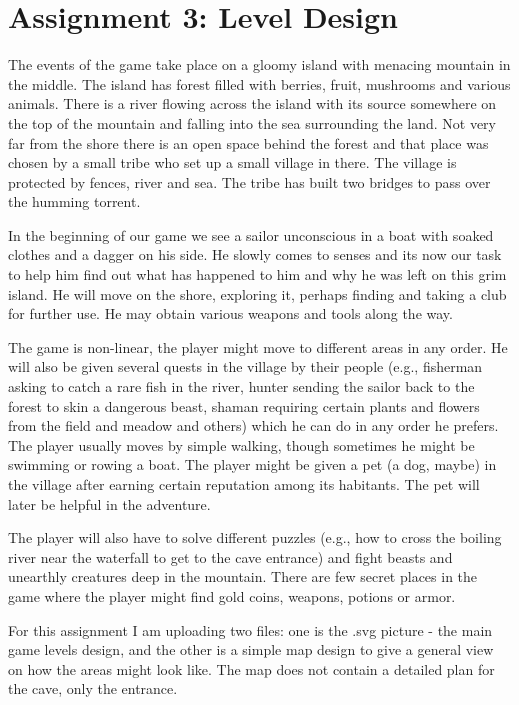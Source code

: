 \documentclass{article}
\begin{document}
\section*{Assignment 3: Level Design}

The events of the game take place on a gloomy island with menacing mountain in
the middle. The island has forest filled with berries, fruit, mushrooms and
various animals. There is a river flowing across the island with its source
somewhere on the top of the mountain and falling into the sea surrounding the
land. Not very far from the shore there is an open space behind the forest and
that place was chosen by a small tribe who set up a small village in there. The
village is protected by fences, river and sea. The tribe has built two bridges
to pass over the humming torrent.

In the beginning of our game we see a sailor unconscious in a boat with soaked
clothes and a dagger on his side. He slowly comes to senses and its now our task
to help him find out what has happened to him and why he was left on this grim
island. He will move on the shore, exploring it, perhaps finding and taking a
club for further use. He may obtain various weapons and tools along the way.

The game is non-linear, the player might move to different areas in any order.
He will also be given several quests in the village by their people (e.g.,
fisherman asking to catch a rare fish in the river, hunter sending the sailor
back to the forest to skin a dangerous beast, shaman requiring certain plants
and flowers from the field and meadow and others) which he can do in any order
he prefers. The player usually moves by simple walking, though sometimes he
might be swimming or rowing a boat. The player might be given a pet (a dog,
maybe) in the village after earning certain reputation among its habitants. The
pet will later be helpful in the adventure.

The player will also have to solve different puzzles (e.g., how to cross the
boiling river near the waterfall to get to the cave entrance) and fight beasts
and unearthly creatures deep in the mountain. There are few secret places in the
game where the player might find gold coins, weapons, potions or armor.

For this assignment I am uploading two files: one is the .svg picture - the main
game levels design, and the other is a simple map design to give a general view
on how the areas might look like. The map does not contain a detailed plan for
the cave, only the entrance.
\end{document}

